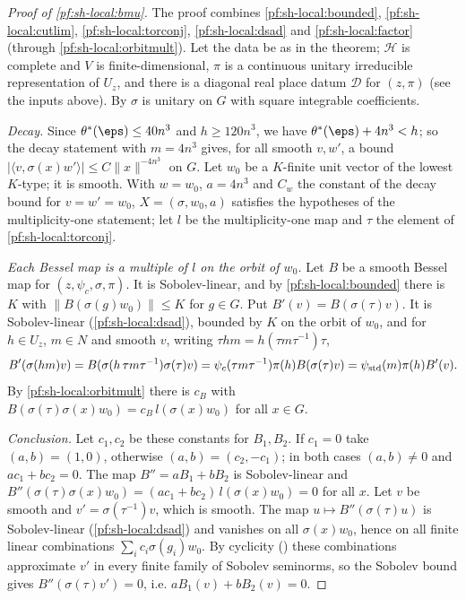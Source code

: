\begin{proof}[Proof of \cref{pf:sh-local:bmu}]
The proof combines \cref{pf:sh-local:bounded}, \cref{pf:sh-local:cutlim}, \cref{pf:sh-local:torconj},
\cref{pf:sh-local:dsad} and \cref{pf:sh-local:factor} (through \cref{pf:sh-local:orbitmult}).
Let the data be as in the theorem; $\mathcal H$ is complete and $V$ is finite-dimensional, $\pi$ is a continuous
unitary irreducible representation of $U_z$, and there is a diagonal real place datum $\mathcal D$ for $(z,\pi)$
(see the inputs above). By  $\sigma$ is
unitary on $G$ with square integrable coefficients.

\emph{Decay.} Since $\theta^*(\eps)\le40n^3$ and $h\ge120n^3$, we have $\theta^*(\eps)+4n^3<h$; so the decay
statement with $m=4n^3$ gives, for all smooth $v,w'$, a bound
$|\langle v,\sigma(x)w'\rangle|\le C\|x\|^{-4n^3}$ on $G$. Let $w_0$ be a $K$-finite unit vector of the lowest
$K$-type; it is smooth. With $w=w_0$, $a=4n^3$ and $C_w$ the constant of the decay bound for $v=w'=w_0$,
$X=(\sigma,w_0,a)$ satisfies the hypotheses of the multiplicity-one statement; let $l$ be the multiplicity-one map
and $\tau$ the element of \cref{pf:sh-local:torconj}.

\emph{Each Bessel map is a multiple of $l$ on the orbit of $w_0$.} Let $B$ be a smooth Bessel map for
$(z,\psi_c,\sigma,\pi)$. It is Sobolev-linear, and by \cref{pf:sh-local:bounded} there is $K$ with
$\|B(\sigma(g)w_0)\|\le K$ for $g\in G$. Put $B'(v)=B(\sigma(\tau)v)$. It is Sobolev-linear
(\cref{pf:sh-local:dsad}), bounded by $K$ on the orbit of $w_0$, and for $h\in U_z$, $m\in N$ and smooth $v$,
writing $\tau hm=h(\tau m\tau^{-1})\tau$,
\[
B'(\sigma(hm)v)=B(\sigma(h\,\tau m\tau^{-1})\sigma(\tau)v)=\psi_c(\tau m\tau^{-1})\pi(h)B(\sigma(\tau)v)=\psi_{\mathrm{std}}(m)\pi(h)B'(v).
\]
By \cref{pf:sh-local:orbitmult} there is $c_B$ with $B(\sigma(\tau)\sigma(x)w_0)=c_B\,l(\sigma(x)w_0)$ for all
$x\in G$.

\emph{Conclusion.} Let $c_1,c_2$ be these constants for $B_1,B_2$. If $c_1=0$ take $(a,b)=(1,0)$, otherwise
$(a,b)=(c_2,-c_1)$; in both cases $(a,b)\ne0$ and $ac_1+bc_2=0$. The map $B''=aB_1+bB_2$ is Sobolev-linear and
$B''(\sigma(\tau)\sigma(x)w_0)=(ac_1+bc_2)\,l(\sigma(x)w_0)=0$ for all $x$. Let $v$ be smooth and
$v'=\sigma(\tau^{-1})v$, which is smooth. The map $u\mapsto B''(\sigma(\tau)u)$ is Sobolev-linear
(\cref{pf:sh-local:dsad}) and vanishes on all $\sigma(x)w_0$, hence on all finite linear combinations
$\sum_ic_i\sigma(g_i)w_0$. By cyclicity () these combinations
approximate $v'$ in every finite family of Sobolev seminorms, so the Sobolev bound gives $B''(\sigma(\tau)v')=0$,
i.e. $aB_1(v)+bB_2(v)=0$.
\end{proof}

